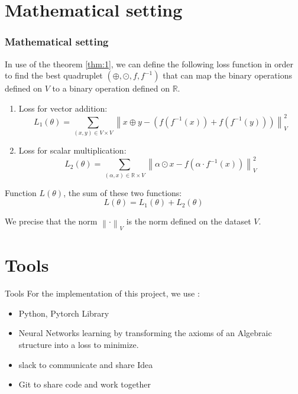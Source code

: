 \documentclass{beamer}
\begin{document}
    \section{Mathematical setting}
    \begin{frame}
        \frametitle{Mathematical setting}
        In use of the theorem \ref{thm:1}, we can define the following loss function in order to find the best  quadruplet $(\oplus,\odot,f,f^{-1})$ that can map the binary operations defined on $V$ to a binary operation defined on $\mathbb{R}$.


        \begin{enumerate}
            \item Loss for vector addition:
            \[
                L_1(\theta) = \sum_{(x, y) \in V \times V} \left\lVert x \oplus y - \left(f(f^{-1}(x)) + f(f^{-1}(y))\right) \right\rVert_{V}^2
            \]
            \item Loss for scalar multiplication:
            \[
                L_2(\theta) = \sum_{(\alpha, x) \in \mathbb{R} \times V} \left\lVert \alpha \odot x - f(\alpha \cdot f^{-1}(x)) \right\rVert_{V}^2
            \]
        \end{enumerate}
    
        Function $L(\theta)$, the sum of these two functions:
        \[
        L(\theta) = L_1(\theta) + L_2(\theta)
        \]
    
        We  precise that the norm $\left\lVert \cdot \right\rVert_{V}$ is the norm defined on the dataset $V$.
    \end{frame}


    
    \section{Tools}
    \begin{frame}{Tools}
        For the implementation of this project, we use :
        \begin{itemize}
            \item Python, Pytorch Library 
            \item Neural Networks learning by transforming the axioms of
            an Algebraic structure into a loss to minimize.
            \item slack to communicate and share Idea
            \item Git to share code and work together
        \end{itemize}
    \end{frame}
    
\end{document}
